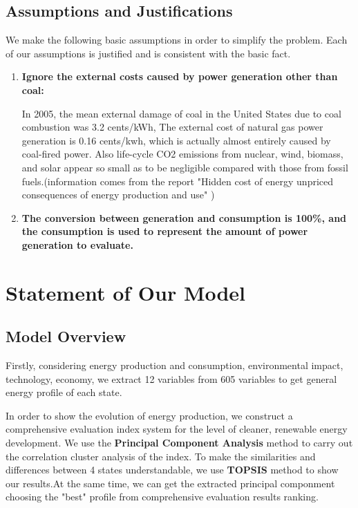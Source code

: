 \documentclass{mcmthesis}
\begin{document}
    \subsection{Assumptions and Justifications}
        \noindent
        We make the following basic assumptions in order to simplify the problem. Each of our assumptions is justified and is consistent with the basic fact.
        \begin{enumerate}
          \item \textbf{Ignore the external costs caused by power generation other than coal:}

              In 2005, the mean external damage of coal in the United States due to coal combustion was 3.2 cents/kWh, The external cost of natural gas power generation is 0.16 cents/kwh, which is actually almost entirely caused by coal-fired power. Also life-cycle CO2 emissions from nuclear, wind, biomass, and solar appear so small as to be negligible compared with those from fossil fuels.(information comes from the report "Hidden cost of energy unpriced consequences of energy production and use" )
          \item \textbf{The conversion between generation and consumption is 100\%, and the consumption is used to represent the amount of power generation to evaluate.}
        \end{enumerate}


\section{Statement of Our Model}
    \subsection{Model Overview}
    Firstly, considering energy production and consumption, environmental impact, technology, economy, we extract 12 variables from 605 variables to get general energy profile of each state.

    In order to show the evolution of energy production, we construct a comprehensive evaluation index system for the level of cleaner, renewable energy development. We use the \textbf{Principal Component Analysis} method to carry out the correlation cluster analysis of the index. To make the similarities and differences between 4 states understandable, we use \textbf{TOPSIS} method to show our results.At the same time, we can get the extracted principal componment choosing the "best" profile from comprehensive evaluation results ranking.
\end{document}

